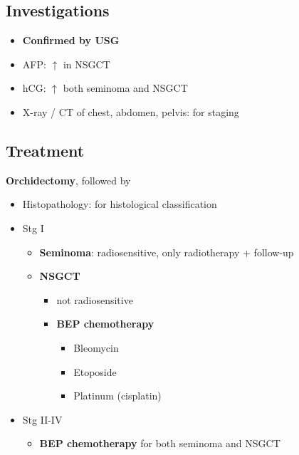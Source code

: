 \documentclass[
  14pt,
]{memoir}
\providecommand{\tightlist}{%
  \setlength{\itemsep}{0pt}\setlength{\parskip}{0pt}}
\begin{document}
\hypertarget{investigations-8}{%
\subsection{Investigations}\label{investigations-8}}

\begin{itemize}
\tightlist
\item
  \textbf{Confirmed by USG}
\item
  AFP: \(\uparrow\) in NSGCT
\item
  hCG: \(\uparrow\) both seminoma and NSGCT
\item
  X-ray / CT of chest, abdomen, pelvis: for staging
\end{itemize}

\hypertarget{treatment-8}{%
\subsection{Treatment}\label{treatment-8}}

\textbf{Orchidectomy}, followed by

\begin{itemize}
\tightlist
\item
  Histopathology: for histological classification
\item
  Stg I

  \begin{itemize}
  \tightlist
  \item
    \textbf{Seminoma}: radiosensitive, only radiotherapy + follow-up
  \item
    \textbf{NSGCT}

    \begin{itemize}
    \tightlist
    \item
      not radiosensitive
    \item
      \textbf{BEP chemotherapy}

      \begin{itemize}
      \tightlist
      \item
        Bleomycin
      \item
        Etoposide
      \item
        Platinum (cisplatin)
      \end{itemize}
    \end{itemize}
  \end{itemize}
\item
  Stg II-IV

  \begin{itemize}
  \tightlist
  \item
    \textbf{BEP chemotherapy} for both seminoma and NSGCT
  \end{itemize}
\end{itemize}
\end{document}
